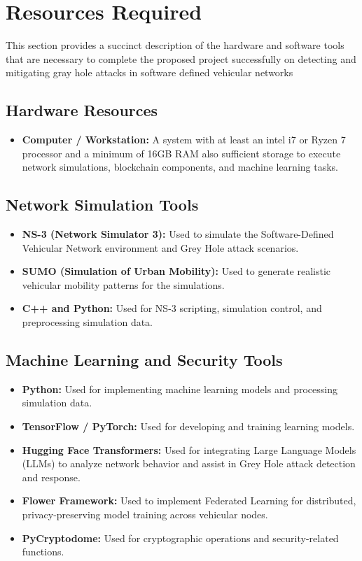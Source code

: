 \documentclass[12pt, a4paper]{report}
\begin{document}
\clearpage %



\section{Resources Required}

This section provides a succinct description of the hardware and software tools that are necessary to complete the proposed project successfully on detecting and mitigating gray hole attacks in software defined vehicular networks

\subsection{Hardware Resources}
\begin{itemize}
    \item \textbf{Computer / Workstation:}
    A system with at least an intel i7 or Ryzen 7 processor and a minimum of 16GB RAM also sufficient storage to execute network simulations, blockchain components, and machine learning tasks.
\end{itemize}

\subsection{Network Simulation Tools}
\begin{itemize}
    \item \textbf{NS-3 (Network Simulator 3):}
    Used to simulate the Software-Defined Vehicular Network environment and Grey Hole attack scenarios.
    \item \textbf{SUMO (Simulation of Urban Mobility):}
    Used to generate realistic vehicular mobility patterns for the simulations.
    \item \textbf{C++ and Python:}
    Used for NS-3 scripting, simulation control, and preprocessing simulation data.
\end{itemize}

\subsection{Machine Learning and Security Tools}
\begin{itemize}
    \item \textbf{Python:}
    Used for implementing machine learning models and processing simulation data.
    \item \textbf{TensorFlow / PyTorch:}
    Used for developing and training learning models.
    \item \textbf{Hugging Face Transformers:}
    Used for integrating Large Language Models (LLMs) to analyze network behavior and assist in Grey Hole attack detection and response.
    \item \textbf{Flower Framework:}
    Used to implement Federated Learning for distributed, privacy-preserving model training across vehicular nodes.
    \item \textbf{PyCryptodome:}
    Used for cryptographic operations and security-related functions.
\end{itemize}
\end{document}
